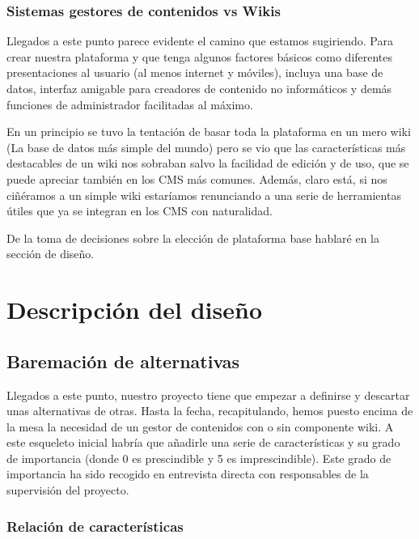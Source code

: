 \subsubsection{Sistemas gestores de contenidos vs Wikis}
\par Llegados a este punto parece evidente el camino que estamos sugiriendo. Para crear nuestra plataforma y que tenga algunos factores básicos como diferentes presentaciones al usuario (al menos internet y móviles), incluya una base de datos, interfaz amigable para creadores de contenido no informáticos y demás funciones de administrador facilitadas al máximo.

En un principio se tuvo la tentación de basar toda la plataforma en un mero wiki (La base de datos más simple del mundo) pero se vio que las características más destacables de un wiki nos sobraban salvo la facilidad de edición y de uso, que se puede apreciar también en los CMS más comunes. Además, claro está, si nos ciñéramos a un simple wiki estaríamos renunciando a una serie de herramientas útiles que ya se integran en los CMS con naturalidad.

De la toma de decisiones sobre la elección de plataforma base hablaré en la sección de diseño.


\section{Descripción del diseño}

\subsection{Baremación de alternativas}
\par Llegados a este punto, nuestro proyecto tiene que empezar a definirse y descartar unas alternativas de otras. Hasta la fecha, recapitulando, hemos puesto encima de la mesa la necesidad de un gestor de contenidos con o sin componente wiki. A este esqueleto inicial habría que añadirle una serie de características y su grado de importancia (donde 0 es prescindible y 5 es imprescindible). Este grado de importancia ha sido recogido en entrevista directa con responsables de la supervisión del proyecto.

\subsubsection{Relación de características}

